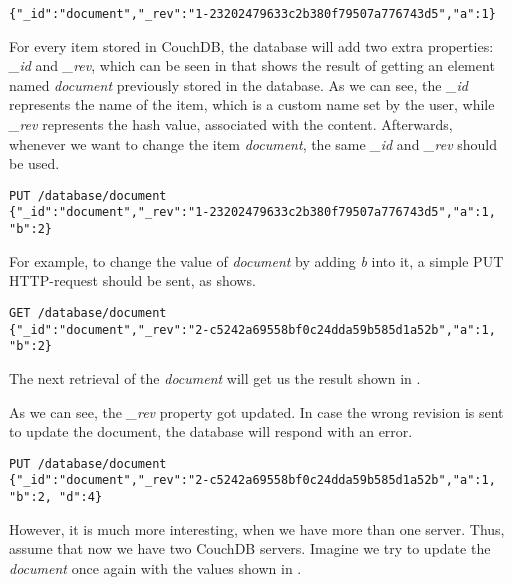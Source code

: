 \begin{lstlisting}[caption={A typical result of retrieving the item \textit{document} stored in CouchDB.}, label={lst:rwork1}]
{"_id":"document","_rev":"1-23202479633c2b380f79507a776743d5","a":1}
\end{lstlisting}

For every item stored in CouchDB, the database will add two extra properties: \textit{\_id} and \textit{\_rev}, which can be seen in  that shows the result of getting an element named \textit{document} previously stored in the database. As we can see, the \textit{\_id} represents the name of the item, which is a custom name set by the user, while \textit{\_rev} represents the hash value, associated with the content. Afterwards, whenever we want to change the item \textit{document}, the same \textit{\_id} and \textit{\_rev} should be used.

\begin{lstlisting}[caption={Updating the value of item \textit{document} by adding \textit{b} into it.}, label={lst:rwork2}]
PUT /database/document
{"_id":"document","_rev":"1-23202479633c2b380f79507a776743d5","a":1, "b":2}
\end{lstlisting}

For example, to change the value of \textit{document} by adding \textit{b} into it, a simple PUT HTTP-request should be sent, as  shows.

\begin{lstlisting}[caption={The result of requesting the updated version of \textit{document}}, label={lst:rwork3}]
GET /database/document
{"_id":"document","_rev":"2-c5242a69558bf0c24dda59b585d1a52b","a":1, "b":2}
\end{lstlisting}

The next retrieval of the \textit{document} will get us the result shown in .

As we can see, the \textit{\_rev} property got updated. In case the wrong revision is sent to update the document, the database will respond with an error.

\begin{lstlisting}[caption={Updating the value of item \textit{document} by adding \textit{d} into it.}, label={lst:rwork4}]
PUT /database/document
{"_id":"document","_rev":"2-c5242a69558bf0c24dda59b585d1a52b","a":1, "b":2, "d":4}
\end{lstlisting}

However, it is much more interesting, when we have more than one server. Thus, assume that now we have two CouchDB servers. Imagine we try to update the \textit{document} once again with the values shown in .

